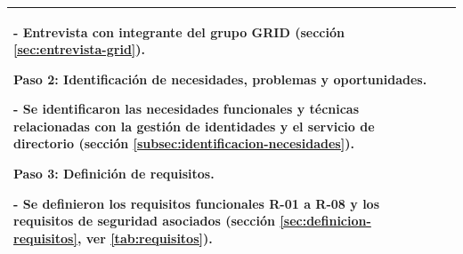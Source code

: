 \begin{table}[htbp]
\begin{tabular}{
		|>{\raggedright\arraybackslash}p{}
		|>{\raggedright\arraybackslash}p{}|}
		- \textbf{Entrevista} con integrante del grupo \ac{GRID} (sección \textcolor[HTML]{1B6B93}{\ref{sec:entrevista-grid}}).\par\vspace{0.6em}
		\textbf{Paso 2: Identificación de necesidades, problemas y oportunidades.}\par\vspace{0.4em}
		- Se identificaron las necesidades funcionales y técnicas relacionadas con la gestión de identidades y el servicio de directorio (sección \textcolor[HTML]{1B6B93}{\ref{subsec:identificacion-necesidades}}).\par\vspace{0.6em}
		\textbf{Paso 3: Definición de requisitos.}\par\vspace{0.4em}
		- Se definieron los requisitos funcionales R-01 a R-08 y los requisitos de seguridad asociados (sección \textcolor[HTML]{1B6B93}{\ref{sec:definicion-requisitos}}, ver \autoref{tab:requisitos}).                                                                                                                                                                                                       \\
		\hline
	\end{tabular}
\end{table}

